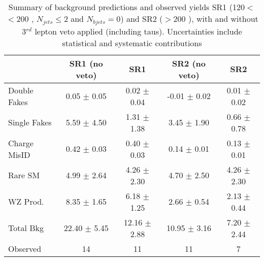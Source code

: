 \begin{table}[htb!]
  \begin{center}
    \caption{Summary of background predictions and observed yields SR1 (120$<$\MET$<$200 \GeV, $N_{jets} \leq 2$ and $N_{bjets} = 0$) and SR2 (\MET$>$200 \GeV), with and without 3$^{rd}$ lepton veto applied (including taus). Uncertainties include statistical and systematic contributions}
    \label{tab:SSYields}
    \vspace{0.3cm}
    \begin{tabular}{l||c|c|c|c}
      \hline \hline
               & SR1 (no veto)    &      SR1         &   SR2 (no veto)  &   SR2             \\ \hline
Double Fakes   &  0.05 $\pm$ 0.05 &  0.02 $\pm$ 0.04 & -0.01 $\pm$ 0.02 &  0.01 $\pm$ 0.02  \\ 
Single Fakes   &  5.59 $\pm$ 4.50 &  1.31 $\pm$ 1.38 &  3.45 $\pm$ 1.90 &  0.66 $\pm$ 0.78 \\ 
Charge MisID   &  0.42 $\pm$ 0.03 &  0.40 $\pm$ 0.03 &  0.14 $\pm$ 0.01 &  0.13 $\pm$ 0.01 \\ 
Rare SM        &  4.99 $\pm$ 2.64 &  4.26 $\pm$ 2.30 &  4.70 $\pm$ 2.50 &  4.26 $\pm$ 2.30 \\ 
WZ Prod.       &  8.35 $\pm$ 1.65 &  6.18 $\pm$ 1.25 &  2.66 $\pm$ 0.54 &  2.13 $\pm$ 0.44 \\ \hline 
Total Bkg      & 22.40 $\pm$ 5.45 & 12.16 $\pm$ 2.88 & 10.95 $\pm$ 3.16 &  7.20 $\pm$ 2.44 \\ \hline 
Observed       & 14               & 11               & 11              &  7                \\ 

      \hline \hline
    \end{tabular}
  \end{center}
\end{table}

